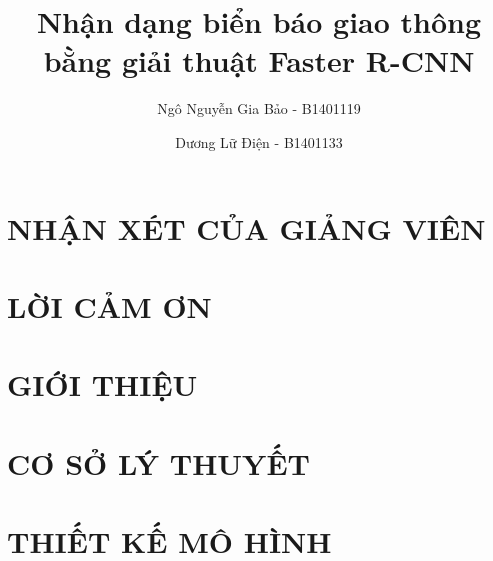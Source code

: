 \documentclass[a4paper,12pt,oneside]{report}
\title{Nhận dạng biển báo giao thông bằng giải thuật Faster R-CNN}						%
\author{Ngô Nguyễn Gia Bảo - B1401119 \and Dương Lữ Điện - B1401133}		%
\begin{document}


\chapter*{NHẬN XÉT CỦA GIẢNG VIÊN}


\chapter*{LỜI CẢM ƠN}


\tableofcontents
\listoffigures
\listoftables

\clearpage
{}	%

\chapter{GIỚI THIỆU}


\chapter{CƠ SỞ LÝ THUYẾT}


\chapter{THIẾT KẾ MÔ HÌNH}

% 
% 
% 
% 

{}

\end{document}
